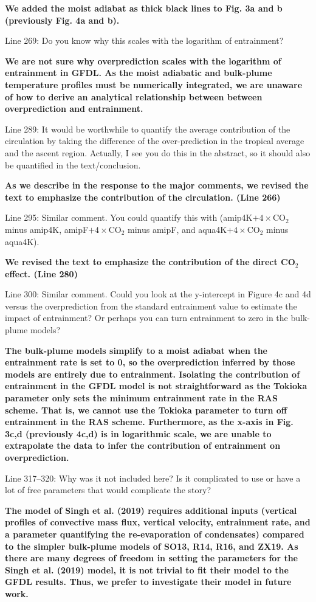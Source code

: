 \documentclass[11pt]{article}
\begin{document}
\textbf{We added the moist adiabat as thick black lines to Fig. 3a and b (previously Fig. 4a and b).}

Line 269: Do you know why this scales with the logarithm of entrainment?

\textbf{We are not sure why overprediction scales with the logarithm of entrainment in GFDL. As the moist adiabatic and bulk-plume temperature profiles must be numerically integrated, we are unaware of how to derive an analytical relationship between between overprediction and entrainment.}

Line 289: It would be worthwhile to quantify the average contribution of the circulation by taking the difference of the over-prediction in the tropical average and the ascent region. Actually, I see you do this in the abstract, so it should also be quantified in the text/conclusion.

\textbf{As we describe in the response to the major comments, we revised the text to emphasize the contribution of the circulation. (Line 266)}

Line 295: Similar comment. You could quantify this with (amip4K\(+4\times\)CO\(_2\) minus amip4K, amipF\(+4\times\)CO\(_2\) minus amipF, and aqua4K\(+4\times\)CO\(_2\) minus aqua4K).

\textbf{We revised the text to emphasize the contribution of the direct CO\(_2\) effect. (Line 280)}

Line 300: Similar comment. Could you look at the y-intercept in Figure 4c and 4d versus the overprediction from the standard entrainment value to estimate the impact of entrainment? Or perhaps you can turn entrainment to zero in the bulk-plume models?

\textbf{The bulk-plume models simplify to a moist adiabat when the entrainment rate is set to 0, so the overprediction inferred by those models are entirely due to entrainment. Isolating the contribution of entrainment in the GFDL model is not straightforward as the Tokioka parameter only sets the minimum entrainment rate in the RAS scheme. That is, we cannot use the Tokioka parameter to turn off entrainment in the RAS scheme. Furthermore, as the x-axis in Fig. 3c,d (previously 4c,d) is in logarithmic scale, we are unable to extrapolate the data to infer the contribution of entrainment on overprediction.}

Line 317--320: Why was it not included here? Is it complicated to use or have a lot of free parameters that would complicate the story?

\textbf{The model of Singh et al. (2019) requires additional inputs (vertical profiles of convective mass flux, vertical velocity, entrainment rate, and a parameter quantifying the re-evaporation of condensates) compared to the simpler bulk-plume models of SO13, R14, R16, and ZX19. As there are many degrees of freedom in setting the parameters for the Singh et al. (2019) model, it is not trivial to fit their model to the GFDL results. Thus, we prefer to investigate their model in future work.}
\end{document}
